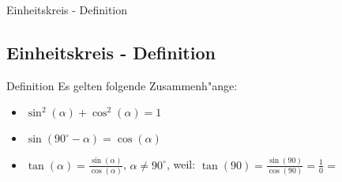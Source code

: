 \documentclass{standalone}
\begin{document}
\begin{frame}
  \begin{center}
    Einheitskreis - Definition
  \end{center}
  \subsection{Einheitskreis - Definition}
\end{frame}

\begin{frame}{Definition}
  Es gelten folgende Zusammenh{"a}nge:\\
  \begin{itemize}
    \item <2-> $\sin^2(\alpha) + \cos^2(\alpha) = 1$
    \item <3-> $\sin(90^\circ - \alpha) = \cos(\alpha)$
    \item <4-> $\tan(\alpha) = \frac{\sin(\alpha)}{\cos(\alpha)}$, $\alpha \neq 90^\circ$, weil:
    $\tan(90)=\frac{\sin(90)}{\cos(90)} = \frac{1}{0} = $ \Lightning
  \end{itemize}
\end{frame}
\end{document}
